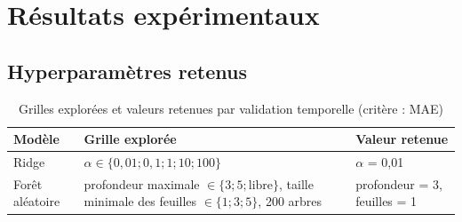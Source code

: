 \documentclass[11pt,a4paper]{article}
\begin{document}
\section{Résultats expérimentaux}\label{sec:results}
\subsection{Hyperparamètres retenus}
\begin{table}[H]\centering\small
\caption{Grilles explorées et valeurs retenues par validation temporelle (critère : MAE)}\label{tab:hyper}
\begin{tabular}{lp{7.2cm}p{4.6cm}}\toprule
Modèle & Grille explorée & Valeur retenue \\ \midrule
Ridge & $\alpha \in \{0{,}01 ; 0{,}1 ; 1 ; 10 ; 100\}$ & $\alpha$ = 0,01 \\
Forêt aléatoire & profondeur maximale $\in \{3 ; 5 ; \text{libre}\}$, taille minimale des feuilles $\in \{1 ; 3 ; 5\}$, 200 arbres & profondeur = 3, feuilles = 1 \\
\bottomrule\end{tabular}
\end{table}
\end{document}

